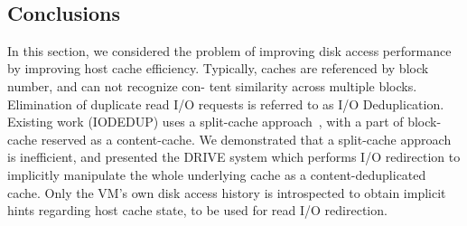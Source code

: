 \begin{figure}
\begin{floatrow}
~~~
\vspace{-0.1in}
\end{floatrow}
\end{figure}

\vspace{-0.05in}
\subsection{Conclusions}
In this section,
we considered the problem of improving disk access performance by improving host
cache efficiency. Typically, caches are referenced by block number, and can not recognize con-
tent similarity across multiple blocks. 
Elimination of duplicate read I/O requests is referred to as I/O Deduplication.
Existing work (IODEDUP) uses a split-cache approach~\cite{iodedup}, 
with a part of block-cache reserved as a content-cache. 
We demonstrated that a split-cache approach is inefficient, and presented
the DRIVE system which performs I/O redirection to implicitly manipulate the whole underlying
cache as a content-deduplicated cache. Only the VM's own disk access history is introspected
to obtain implicit hints regarding host cache state, to be used for read I/O redirection.


